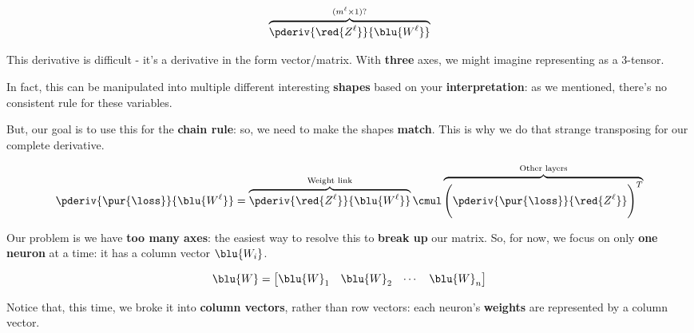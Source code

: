         \begin{equation}
            \overbrace{
                \pderiv {\red{Z^\ell}}   {\blu{W^{\ell}}} 
            }^{ (m^{\ell} \times 1) ?}
        \end{equation}
        
        This derivative is difficult - it's a derivative in the form vector/matrix. With \textbf{three} axes, we might imagine representing as a 3-tensor.
        
        In fact, this can be manipulated into multiple different interesting \textbf{shapes} based on your \textbf{interpretation}: as we mentioned, there's no consistent rule for these variables.
            
        But, our goal is to use this for the \textbf{chain rule}: so, we need to make the shapes \textbf{match}. This is why we do that strange transposing for our complete derivative.
        
            \begin{equation}
                \pderiv {\pur{\loss}} {\blu{W^{\ell}}} 
                =
                \overbrace{
                    \pderiv {\red{Z^\ell}}   {\blu{W^{\ell}}}
                }^{\text{Weight link}} 
                    \cmul
                \overbrace{
                    \Bigg(
                        \pderiv {\pur{\loss}} {\red{Z^\ell}}
                    \Bigg)^T
                }^{\text{Other layers}}
            \end{equation}
            
        \subsecdiv
        
        Our problem is we have \textbf{too many axes}: the easiest way to resolve this to \textbf{break up} our matrix. So, for now, we focus on only \textbf{one neuron} at a time: it has a column vector $\blu{W_i}$.
        
        \begin{equation}
            \blu{W}
            =
            \begin{bmatrix}
                \blu{W}_1 & \blu{W}_2 & \cdots & \blu{W}_n
            \end{bmatrix}
        \end{equation}
        
        Notice that, this time, we broke it into \textbf{column vectors}, rather than row vectors: each neuron's \textbf{weights} are represented by a column vector.
        
